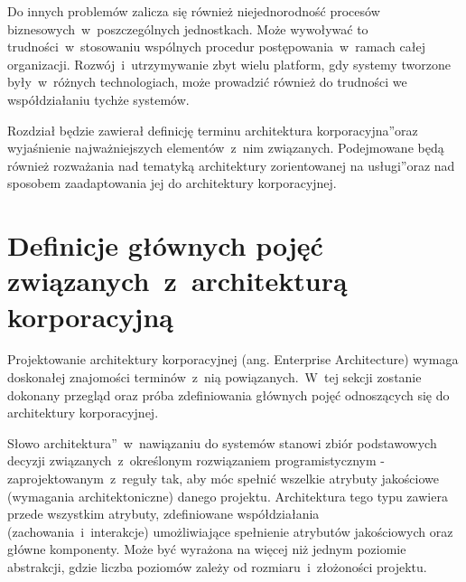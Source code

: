 Do innych problemów zalicza się również niejednorodność procesów biznesowych~w~poszczególnych jednostkach. Może wywoływać to trudności~w~stosowaniu wspólnych procedur postępowania~w~ramach całej organizacji. Rozwój~i~utrzymywanie zbyt wielu platform, gdy systemy tworzone były~w~różnych technologiach, może prowadzić również do trudności we współdziałaniu tychże systemów.

Rozdział będzie zawierał definicję terminu \quotedblbase architektura korporacyjna\textquotedblright oraz wyjaśnienie najważniejszych elementów~z~nim związanych. Podejmowane będą również rozważania nad tematyką \quotedblbase architektury zorientowanej na usługi\textquotedblright oraz nad sposobem zaadaptowania jej do architektury korporacyjnej.

\section{Definicje głównych pojęć związanych~z~architekturą korporacyjną}
Projektowanie architektury korporacyjnej (ang. Enterprise Architecture) wymaga doskonałej znajomości terminów~z~nią powiązanych.~W~tej sekcji zostanie dokonany przegląd oraz próba zdefiniowania głównych pojęć odnoszących się do architektury korporacyjnej.

Słowo \quotedblbase architektura\textquotedblright~w~nawiązaniu do systemów stanowi zbiór podstawowych decyzji związanych~z~określonym rozwiązaniem programistycznym  - zaprojektowanym~z~reguły tak, aby móc spełnić wszelkie atrybuty jakościowe (wymagania architektoniczne) danego projektu. Architektura tego typu zawiera przede wszystkim atrybuty, zdefiniowane współdziałania (zachowania~i~interakcje) umożliwiające spełnienie atrybutów jakościowych oraz główne komponenty.  Może być wyrażona na więcej niż jednym poziomie abstrakcji, gdzie liczba poziomów zależy od rozmiaru~i~złożoności projektu. 


